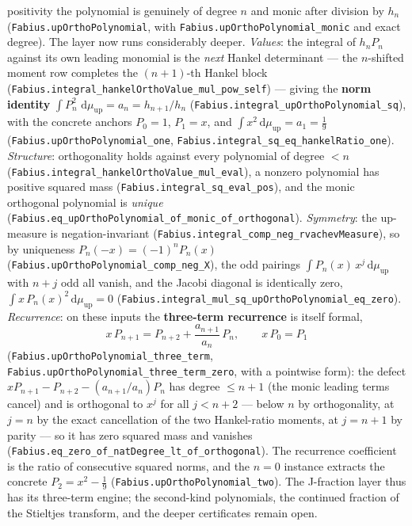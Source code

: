 \documentclass[11pt,oneside]{article}
\theoremstyle{definition}
\theoremstyle{remark}
\newcommand{\Up}{\operatorname{up}}
\newcommand{\dd}{\,\mathrm d}
\newcommand{\1}{\mathbf 1}
\begin{document}
positivity the polynomial is genuinely of degree $n$ and monic after division by $h_n$
(\nolinkurl{Fabius.upOrthoPolynomial}, with \nolinkurl{Fabius.upOrthoPolynomial\_monic} and exact degree).
The layer now runs considerably deeper.  \emph{Values}: the integral of $h_nP_n$ against
its own leading monomial is the \emph{next} Hankel determinant --- the $n$-shifted moment
row completes the $(n{+}1)$-th Hankel block (\nolinkurl{Fabius.integral\_hankelOrthoValue\_mul\_pow\_self}) --- giving the
\textbf{norm identity} $\int P_n^2\,\dd\mu_{\Up}=a_n=h_{n+1}/h_n$
(\nolinkurl{Fabius.integral\_upOrthoPolynomial\_sq}), with the concrete anchors $P_0=1$,
$P_1=x$, and $\int x^2\dd\mu_{\Up}=a_1=\tfrac19$ (\nolinkurl{Fabius.upOrthoPolynomial\_one},
\nolinkurl{Fabius.integral\_sq\_eq\_hankelRatio\_one}).  \emph{Structure}: orthogonality holds
against every polynomial of degree $<n$ (\nolinkurl{Fabius.integral\_hankelOrthoValue\_mul\_eval}),
a nonzero polynomial has positive squared mass
(\nolinkurl{Fabius.integral\_sq\_eval\_pos}), and the monic orthogonal polynomial is
\emph{unique} (\nolinkurl{Fabius.eq\_upOrthoPolynomial\_of\_monic\_of\_orthogonal}).  \emph{Symmetry}:
the up-measure is negation-invariant (\nolinkurl{Fabius.integral\_comp\_neg\_rvachevMeasure}),
so by uniqueness $P_n(-x)=(-1)^nP_n(x)$ (\nolinkurl{Fabius.upOrthoPolynomial\_comp\_neg\_X}),
the odd pairings $\int P_n(x)\,x^j\dd\mu_{\Up}$ with $n+j$ odd all vanish, and the Jacobi
diagonal is identically zero, $\int x\,P_n(x)^2\dd\mu_{\Up}=0$
(\nolinkurl{Fabius.integral\_mul\_sq\_upOrthoPolynomial\_eq\_zero}).  \emph{Recurrence}: on these
inputs the \textbf{three-term recurrence} is itself formal,
\[x\,P_{n+1}=P_{n+2}+\frac{a_{n+1}}{a_n}\,P_n,\qquad x\,P_0=P_1\]
(\nolinkurl{Fabius.upOrthoPolynomial\_three\_term}, \nolinkurl{Fabius.upOrthoPolynomial\_three\_term\_zero}, with a pointwise
form): the defect $x P_{n+1}-P_{n+2}-(a_{n+1}/a_n)P_n$ has degree $\le n{+}1$ (the
monic leading terms cancel) and is orthogonal to $x^j$ for all $j<n+2$ --- below $n$
by orthogonality, at $j=n$ by the exact cancellation of the two Hankel-ratio
moments, at $j=n+1$ by parity --- so it has zero squared mass and vanishes
(\nolinkurl{Fabius.eq\_zero\_of\_natDegree\_lt\_of\_orthogonal}).  The recurrence coefficient
is the ratio of consecutive squared norms, and the $n=0$ instance extracts the
concrete $P_2=x^2-\tfrac19$ (\nolinkurl{Fabius.upOrthoPolynomial\_two}).  The J-fraction
layer thus has its three-term engine; the second-kind polynomials, the continued
fraction of the Stieltjes transform, and the deeper certificates remain open.
\end{document}
